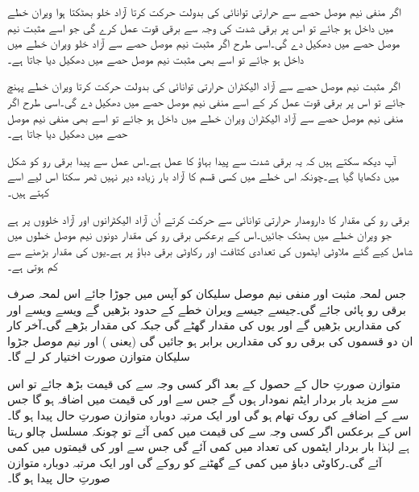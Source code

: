 اگر منفی نیم موصل حصے سے حرارتی توانائی کی بدولت حرکت کرتا آزاد  خلو بھٹکتا ہوا ویران خطے میں داخل ہو جائے تو اس پر برقی شدت کی وجہ سے برقی قوت   عمل کرے گی جو اسے مثبت نیم موصل حصے میں دھکیل دے گی۔اسی طرح اگر مثبت نیم موصل حصے سے آزاد خلو ویران خطے میں داخل ہو جائے تو اسے بھی مثبت نیم موصل حصے میں دھکیل دیا جاتا ہے۔ 

اگر مثبت نیم موصل حصے سے آزاد الیکٹران حرارتی توانائی کی بدولت حرکت کرتا ویران خطے پہنچ جائے تو اس پر برقی قوت   عمل کر کے اسے منفی نیم موصل حصے میں دھکیل دے گی۔اسی طرح اگر منفی نیم موصل حصے سے آزاد الیکٹران ویران خطے میں داخل ہو جائے تو اسے بھی منفی نیم موصل حصے میں دھکیل دیا جاتا ہے۔ 

آپ دیکھ سکتے ہیں کہ یہ برقی شدت سے پیدا بہاؤ کا عمل ہے۔اس عمل سے پیدا برقی رو  کو شکل میں دکھایا گیا ہے۔چونکہ اس خطے میں کسی قسم کا آزاد بار زیادہ دیر نہیں ٹھر سکتا اس لیے اسے  کہتے ہیں۔

برقی رو  کی مقدار کا دارومدار حرارتی توانائی سے حرکت کرتے اُن آزاد الیکٹرانوں اور آزاد خلووں پر ہے جو ویران خطے میں بھٹک جائیں۔اس کے برعکس برقی رو  کی مقدار دونوں نیم موصل خطوں میں شامل کیے گئے ملاوٹی ایٹموں کی تعدادی کثافت اور رکاوٹی برقی دباؤ  پر ہے۔یوں  کی مقدار  بڑھنے سے کم ہوتی ہے۔

جس لمحہ مثبت اور منفی نیم موصل سلیکان کو آپس میں جوڑا جائے اس لمحہ صرف  برقی رو پائی جائے گی۔جیسے جیسے ویران خطے کے حدود بڑھیں گے ویسے ویسے    اور  کی مقداریں بڑھیں گے اور یوں  کی مقدار گھٹے گی جبکہ  کی مقدار بڑھے گی۔آخر کار ان دو قسموں کی برقی رو کی مقداریں برابر ہو جائیں گی (یعنی  )  اور نیم موصل جڑوا سلیکان متوازن صورت اختیار کر لے گا۔

متوازن صورتِ حال کے حصول کے بعد اگر کسی وجہ سے  کی قیمت بڑھ جائے تو اس سے مزید بار بردار ایٹم نمودار ہوں گے جس سے  اور  کی قیمت میں اضافہ ہو گا جس سے   کے اضافے کی روک تھام ہو گی اور ایک مرتبہ دوبارہ متوازن صورتِ حال پیدا ہو گا۔اس کے برعکس اگر کسی وجہ سے   کی قیمت میں کمی آئے تو چونکہ   مسلسل چالو رہتا ہے لہٰذا بار بردار ایٹموں کی تعداد میں کمی آئے گی جس سے   اور  کی قیمتوں میں کمی آئے گی۔رکاوٹی دباؤ میں کمی   کے گھٹنے کو روکے گی اور ایک مرتبہ دوبارہ متوازن صورتِ حال پیدا ہو گا۔


